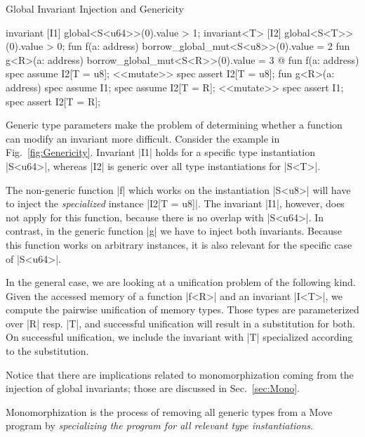 \begin{Figure}
  \caption{Global Invariant Injection and Genericity}
  \label{fig:Genericity}
  \centering
\begin{MoveBox}
  invariant [I1] global<S<u64>>(0).value > 1;
  invariant<T> [I2] global<S<T>>(0).value > 0;
  fun f(a: address) { borrow_global_mut<S<u8>>(0).value = 2 }
  fun g<R>(a: address) { borrow_global_mut<S<R>>(0).value = 3 }
  @\transform@
  fun f(a: address) {
    spec assume I2[T = u8];
    <<mutate>>
    spec assert I2[T = u8];
  }
  fun g<R>(a: address) {
    spec assume I1;
    spec assume I2[T = R];
    <<mutate>>
    spec assert I1;
    spec assert I2[T = R];
  }
\end{MoveBox}
\end{Figure}

Generic type parameters make the problem of determining whether a function can
modify an invariant more difficult.  Consider the example in
Fig.~\ref{fig:Genericity}. Invariant |I1| holds for a specific type
instantiation |S<u64>|, whereas |I2| is generic over all type instantiations for
|S<T>|.

The non-generic function |f| which works on the instantiation |S<u8>| will have
to inject the \emph{specialized} instance |I2[T = u8]|. The invariant |I1|,
however, does not apply for this function, because there is no overlap with
|S<u64>|.  In contrast, in the generic function |g| we have to inject both
invariants. Because this function works on arbitrary instances, it is also
relevant for the specific case of |S<u64>|.

In the general case, we are looking at a unification problem of the following
kind. Given the accessed memory of a function |f<R>| and an invariant |I<T>|, we
compute the pairwise unification of memory types. Those types are parameterized
over |R| resp. |T|, and successful unification will result in a substitution for
both. On successful unification, we include the invariant with |T| specialized
according to the substitution.

Notice that there are implications related to monomorphization coming from the
injection of global invariants; those are discussed in Sec.~\ref{sec:Mono}.


\label{sec:Mono}

Monomorphization is the process of removing all generic types from a Move
program by \emph{specializing the program for all relevant type instantiations}.


